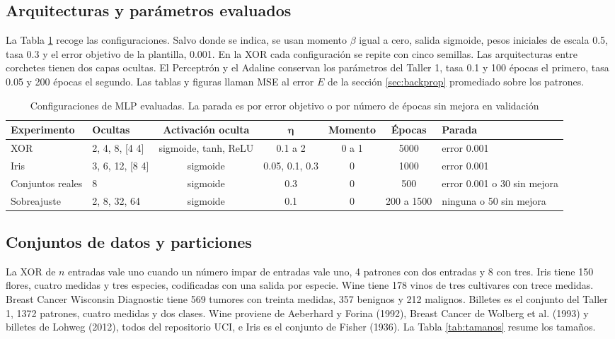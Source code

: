 \documentclass[11pt,letterpaper]{article}
\begin{document}
\subsection{Arquitecturas y parámetros evaluados}

La Tabla \ref{tab:config} recoge las configuraciones. Salvo donde se indica, se usan momento $\beta$ igual a cero, salida sigmoide, pesos iniciales de escala 0.5, tasa 0.3 y el error objetivo de la plantilla, 0.001. En la XOR cada configuración se repite con cinco semillas. Las arquitecturas entre corchetes tienen dos capas ocultas. El Perceptrón y el Adaline conservan los parámetros del Taller 1, tasa 0.1 y 100 épocas el primero, tasa 0.05 y 200 épocas el segundo. Las tablas y figuras llaman MSE al error $E$ de la sección \ref{sec:backprop} promediado sobre los patrones.

\begin{table}[!htb]
    \centering
    \caption{Configuraciones de MLP evaluadas. La parada es por error objetivo o por número de épocas sin mejora en validación}
    \label{tab:config}
    \scriptsize
    \setlength{\tabcolsep}{3pt}
    \begin{tabular}{llcccc l}
        \toprule
        \textbf{Experimento} & \textbf{Ocultas} & \textbf{Activación oculta} & $\boldsymbol{\eta}$ & \textbf{Momento} & \textbf{Épocas} & \textbf{Parada} \\
        \midrule
        XOR & 2, 4, 8, [4 4] & sigmoide, tanh, ReLU & 0.1 a 2 & 0 a 1 & 5000 & error 0.001 \\
        Iris & 3, 6, 12, [8 4] & sigmoide & 0.05, 0.1, 0.3 & 0 & 1000 & error 0.001 \\
        Conjuntos reales & 8 & sigmoide & 0.3 & 0 & 500 & error 0.001 o 30 sin mejora \\
        Sobreajuste & 2, 8, 32, 64 & sigmoide & 0.1 & 0 & 200 a 1500 & ninguna o 50 sin mejora \\
        \bottomrule
    \end{tabular}
\end{table}

\subsection{Conjuntos de datos y particiones}

La XOR de $n$ entradas vale uno cuando un número impar de entradas vale uno, 4 patrones con dos entradas y 8 con tres. Iris tiene 150 flores, cuatro medidas y tres especies, codificadas con una salida por especie. Wine tiene 178 vinos de tres cultivares con trece medidas. Breast Cancer Wisconsin Diagnostic tiene 569 tumores con treinta medidas, 357 benignos y 212 malignos. Billetes es el conjunto del Taller 1, 1372 patrones, cuatro medidas y dos clases. Wine proviene de Aeberhard y Forina (1992), Breast Cancer de Wolberg et al. (1993) y billetes de Lohweg (2012), todos del repositorio UCI, e Iris es el conjunto de Fisher (1936). La Tabla \ref{tab:tamanos} resume los tamaños.
\end{document}
